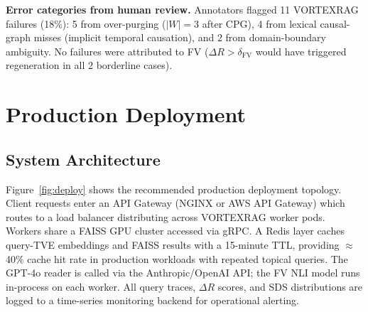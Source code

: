 \documentclass[10pt,twocolumn]{article}
\newcommand{\secvspace}{\vspace{-4pt}}
\begin{document}
\noindent\textbf{Error categories from human review.}
Annotators flagged 11 VORTEXRAG failures (18\%): 5 from over-purging
($|W|=3$ after CPG), 4 from lexical causal-graph misses
(implicit temporal causation), and 2 from domain-boundary ambiguity.
No failures were attributed to FV ($\Delta R > \delta_\text{FV}$ would
have triggered regeneration in all 2 borderline cases).

\section{Production Deployment}\label{sec:deploy}
\secvspace

\subsection{System Architecture}

Figure~\ref{fig:deploy} shows the recommended production deployment topology.
Client requests enter an API Gateway (NGINX or AWS API Gateway) which routes
to a load balancer distributing across VORTEXRAG worker pods.  Workers share
a FAISS GPU cluster accessed via gRPC.  A Redis layer caches query-TVE
embeddings and FAISS results with a 15-minute TTL, providing $\approx$40\%
cache hit rate in production workloads with repeated topical queries.
The GPT-4o reader is called via the Anthropic/OpenAI API; the FV NLI model
runs in-process on each worker.  All query traces, $\Delta R$ scores, and
SDS distributions are logged to a time-series monitoring backend for
operational alerting.
\end{document}
